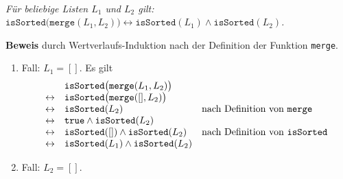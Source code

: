 \begin{Lemma} \hspace*{\fill} \\
{\em
  F\"ur beliebige Listen $L_1$ und $L_2$ gilt: \\[0.1cm]
  \hspace*{1.3cm} 
  $\texttt{isSorted}\bigl(\texttt{merge}(L_1,L_2)\bigr) \leftrightarrow \mathtt{isSorted}(L_1) \wedge \mathtt{isSorted}(L_2)$.
}
\end{Lemma}

\noindent
\textbf{Beweis} durch Wertverlaufs-Induktion nach der Definition der Funktion \texttt{merge}.
\begin{enumerate}
\item Fall: $L_1 = []$.  Es gilt 
      \[
      \begin{array}{cll}
                        & \mathtt{isSorted}\bigl(\mathtt{merge}(L_1, L_2)\bigr) \\
        \leftrightarrow & \mathtt{isSorted}\bigl(\mathtt{merge}([], L_2)\bigr) \\
        \leftrightarrow & \mathtt{isSorted}(L_2) & \mbox{nach Definition von \texttt{merge}} \\
        \leftrightarrow & \mathtt{true} \wedge \mathtt{isSorted}(L_2)  \\
        \leftrightarrow & \mathtt{isSorted}([]) \wedge \mathtt{isSorted}(L_2)  &
                          \mbox{nach Definition von \texttt{isSorted}} \\
        \leftrightarrow & \mathtt{isSorted}(L_1) \wedge \mathtt{isSorted}(L_2)  &
      \end{array}
      \]
\item Fall: $L_2 = []$. 


\end{enumerate}
